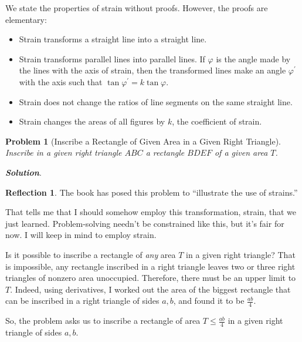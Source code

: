 \documentclass[11pt]{article}
\theoremstyle{definition}
\theoremstyle{plain}
\theoremstyle{problemstyle}
\newtheorem{problem}{Problem}
\theoremstyle{remark}
\theoremstyle{definition}
\newtheorem{reflection}{Reflection}
\begin{document}
We state the properties of strain without proofs. However, the proofs are elementary:

\begin{itemize}\label{prop:strains}
    \item\label{prop:strain-line} Strain transforms a straight line into a straight line.
    \item\label{prop:strain-para-lines} Strain transforms parallel lines into parallel lines. If $\varphi$ is the angle made by the lines with the axis of strain, then the transformed lines make an angle $\varphi^\prime$ with the axis such that $\tan\varphi^\prime=k\tan\varphi$.
    \item\label{prop:ratio-line} Strain does not change the ratios of line segments on the same straight line.
    \item\label{prop:area-change} Strain changes the areas of all figures by $k$, the coefficient of strain.
\end{itemize}

\begin{problem}[Inscribe a Rectangle of Given Area in a Given Right Triangle]\label{pr:inscribe-rect-given-area-in-given-right-tr}
    Inscribe in a given right triangle $ABC$ a rectangle $BDEF$ of a given area $T$.
\end{problem}

\textbf{\emph{Solution}}. 

\begin{reflection}
    The book has posed this problem to ``illustrate the use of strains.''

    That tells me that I should somehow employ this transformation, strain, that we just learned. Problem-solving needn't be constrained like this, but it's fair for now. I will keep in mind to employ strain.

    Is it possible to inscribe a rectangle of \emph{any} area $T$ in a given right triangle? That is impossible, any rectangle inscribed in a right triangle leaves two or three right triangles of nonzero area unoccupied. Therefore, there must be an upper limit to $T$. Indeed, using derivatives, I worked out the area of the biggest rectangle that can be inscribed in a right triangle of sides $a, b$, and found it to be $\frac{ab}{4}$.

    So, the problem asks us to inscribe a rectangle of area $T\leq\frac{ab}{4}$ in a given right triangle of sides $a,b$.
\end{reflection}
\end{document}
